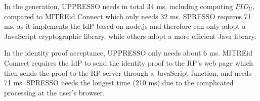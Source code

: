 In the generation, UPPRESSO needs in total 34 ms, including computing $PID_U$, compared to MITREid Connect which only needs 32 ms.
SPRESSO requires 71 ms, as it implements the IdP based on node.js and therefore can only adopt a JavaScript cryptographic library, while others adopt a more efficient Java library.

In the identity proof acceptance, UPPRESSO only needs  about 6 ms. %
MITREid Connect requires the IdP to send the identity proof to the RP's web page which then sends the proof to the RP server through a JavaScript function, and needs 71 ms.
SPRESSO needs the longest time (210 ms) due to the complicated processing at the user's browser.



